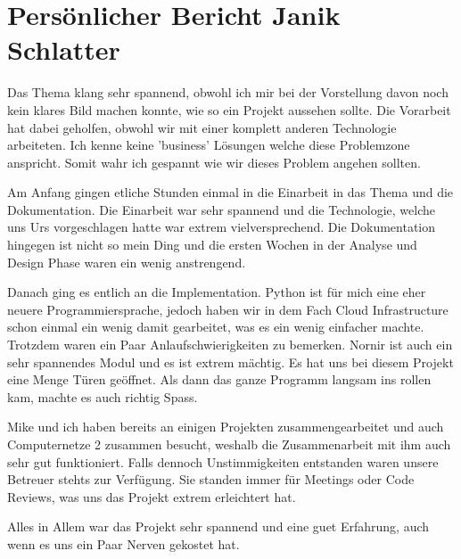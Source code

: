 \documentclass[]{subfiles}
\begin{document}
\section*{Persönlicher Bericht Janik Schlatter}
Das Thema klang sehr spannend, obwohl ich mir bei der Vorstellung davon noch kein klares Bild machen konnte, 
wie so ein Projekt aussehen sollte.
Die Vorarbeit hat dabei geholfen, obwohl wir mit einer komplett anderen Technologie arbeiteten. 
Ich kenne keine 'business' Lösungen welche diese Problemzone anspricht.
Somit wahr ich gespannt wie wir dieses Problem angehen sollten.

Am Anfang gingen etliche Stunden einmal in die Einarbeit in das Thema und die Dokumentation. 
Die Einarbeit war sehr spannend und die Technologie, welche uns Urs vorgeschlagen hatte war extrem vielversprechend. 
Die Dokumentation hingegen ist nicht so mein Ding und die ersten Wochen in der Analyse und Design Phase 
waren ein wenig anstrengend.

Danach ging es entlich an die Implementation. 
Python ist für mich eine eher neuere Programmiersprache, 
jedoch haben wir in dem Fach Cloud Infrastructure schon einmal ein wenig damit gearbeitet, 
was es ein wenig einfacher machte. 
Trotzdem waren ein Paar Anlaufschwierigkeiten zu bemerken. 
Nornir ist auch ein sehr spannendes Modul und es ist extrem mächtig. 
Es hat uns bei diesem Projekt eine Menge Türen geöffnet. 
Als dann das ganze Programm langsam ins rollen kam, machte es auch richtig Spass.

Mike und ich haben bereits an einigen Projekten zusammengearbeitet und auch Computernetze 2 zusammen besucht, 
weshalb die Zusammenarbeit mit ihm auch sehr gut funktioniert.
Falls dennoch Unstimmigkeiten entstanden waren unsere Betreuer stehts zur Verfügung. 
Sie standen immer für Meetings oder Code Reviews, was uns das Projekt extrem erleichtert hat.

Alles in Allem war das Projekt sehr spannend und eine guet Erfahrung, auch wenn es uns ein Paar Nerven gekostet hat.
\end{document}
